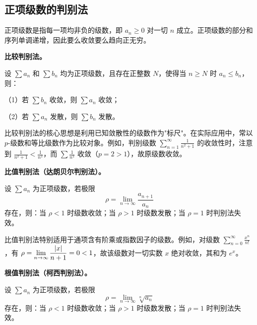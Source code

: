\subsection{正项级数的判别法}

正项级数是指每一项均非负的级数，即 $a_n \geq 0$ 对一切 $n$ 成立。正项级数的部分和序列单调递增，因此要么收敛要么趋向正无穷。

\textbf{比较判别法。}

\begin{theorem}[比较判别法]
设 $\displaystyle \sum a_n$ 和 $\displaystyle \sum b_n$ 均为正项级数，且存在正整数 $N$，使得当 $n \geq N$ 时 $a_n \leq b_n$，则：

（1）若 $\displaystyle \sum b_n$ 收敛，则 $\displaystyle \sum a_n$ 收敛；

（2）若 $\displaystyle \sum a_n$ 发散，则 $\displaystyle \sum b_n$ 发散。
\end{theorem}

比较判别法的核心思想是利用已知敛散性的级数作为"标尺"。在实际应用中，常以 $p$-级数和等比级数作为比较对象。例如，判别级数 $\displaystyle \sum_{n=1}^{\infty} \frac{1}{n^2 + 1}$ 的收敛性时，注意到 $\frac{1}{n^2 + 1} < \frac{1}{n^2}$，而 $\displaystyle \sum \frac{1}{n^2}$ 收敛（$p = 2 > 1$），故原级数收敛。

\textbf{比值判别法（达朗贝尔判别法）。}

\begin{theorem}[比值判别法]
设 $\displaystyle \sum a_n$ 为正项级数，若极限
\begin{equation}
\rho = \lim_{n \to \infty} \frac{a_{n+1}}{a_n}
\end{equation}
存在，则：当 $\rho < 1$ 时级数收敛；当 $\rho > 1$ 时级数发散；当 $\rho = 1$ 时判别法失效。
\end{theorem}

比值判别法特别适用于通项含有阶乘或指数因子的级数。例如，对级数 $\displaystyle \sum_{n=0}^{\infty} \frac{x^n}{n!}$，有 $\displaystyle \rho = \lim_{n \to \infty} \frac{\left|x\right|}{n+1} = 0 < 1$，故该级数对一切实数 $x$ 绝对收敛，其和为 $e^x$。

\textbf{根值判别法（柯西判别法）。}

\begin{theorem}[根值判别法]
设 $\displaystyle \sum a_n$ 为正项级数，若极限
\begin{equation}
\rho = \lim_{n \to \infty} \sqrt[n]{a_n}
\end{equation}
存在，则：当 $\rho < 1$ 时级数收敛；当 $\rho > 1$ 时级数发散；当 $\rho = 1$ 时判别法失效。
\end{theorem}

